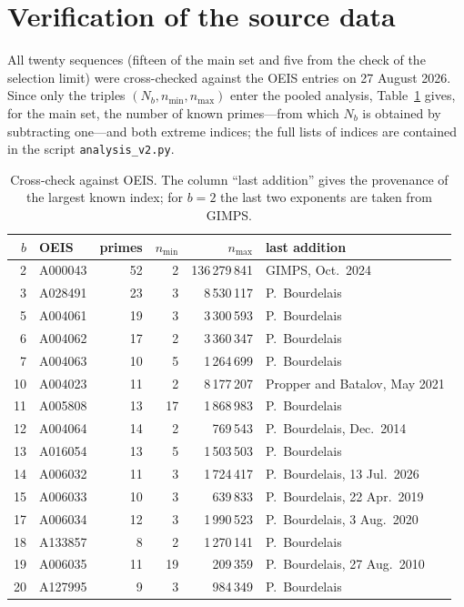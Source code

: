 \documentclass[11pt,a4paper]{article}
\theoremstyle{plain}
\theoremstyle{remark}
\begin{document}
\appendix
\section{Verification of the source data}\label{app:data}

All twenty sequences (fifteen of the main set and five from the check of the
selection limit) were cross-checked against the OEIS entries on 27 August 2026.
Since only the triples $(N_b,n_{\min},n_{\max})$ enter the pooled analysis,
Table~\ref{tab:verify} gives, for the main set, the number of known primes---from
which $N_b$ is obtained by subtracting one---and both extreme indices; the full
lists of indices are contained in the script \texttt{analysis\_v2.py}.

\begin{table}[h]
\centering
\caption{Cross-check against OEIS. The column ``last addition'' gives the
provenance of the largest known index; for $b=2$ the last two exponents are taken
from GIMPS.}
\label{tab:verify}
\small
\begin{tabular}{rlrrrl}
\toprule
$b$ & OEIS & primes & $n_{\min}$ & $n_{\max}$ & last addition\\
\midrule
2 & A000043 & 52 & 2 & 136\,279\,841 & GIMPS, Oct.\ 2024\\
3 & A028491 & 23 & 3 & 8\,530\,117 & P.~Bourdelais\\
5 & A004061 & 19 & 3 & 3\,300\,593 & P.~Bourdelais\\
6 & A004062 & 17 & 2 & 3\,360\,347 & P.~Bourdelais\\
7 & A004063 & 10 & 5 & 1\,264\,699 & P.~Bourdelais\\
10 & A004023 & 11 & 2 & 8\,177\,207 & Propper and Batalov, May 2021\\
11 & A005808 & 13 & 17 & 1\,868\,983 & P.~Bourdelais\\
12 & A004064 & 14 & 2 & 769\,543 & P.~Bourdelais, Dec.\ 2014\\
13 & A016054 & 13 & 5 & 1\,503\,503 & P.~Bourdelais\\
14 & A006032 & 11 & 3 & 1\,724\,417 & P.~Bourdelais, 13 Jul.\ 2026\\
15 & A006033 & 10 & 3 & 639\,833 & P.~Bourdelais, 22 Apr.\ 2019\\
17 & A006034 & 12 & 3 & 1\,990\,523 & P.~Bourdelais, 3 Aug.\ 2020\\
18 & A133857 & 8 & 2 & 1\,270\,141 & P.~Bourdelais\\
19 & A006035 & 11 & 19 & 209\,359 & P.~Bourdelais, 27 Aug.\ 2010\\
20 & A127995 & 9 & 3 & 984\,349 & P.~Bourdelais\\
\bottomrule
\end{tabular}
\end{table}
\end{document}
